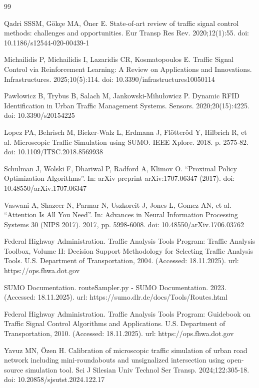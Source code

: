\documentclass[12pt,a4paper]{article}
\begin{document}
\begin{thebibliography}{99}

Qadri SSSM, Gökçe MA, Öner E. State-of-art review of traffic signal control methods: challenges and opportunities. Eur Transp Res Rev. 2020;12(1):55. doi: 10.1186/s12544-020-00439-1

Michailidis P, Michailidis I, Lazaridis CR, Kosmatopoulos E. Traffic Signal Control via Reinforcement Learning: A Review on Applications and Innovations. Infrastructures. 2025;10(5):114. doi: 10.3390/infrastructures10050114

Pawłowicz B, Trybus B, Salach M, Jankowski-Mihułowicz P. Dynamic RFID Identification in Urban Traffic Management Systems. Sensors. 2020;20(15):4225. doi: 10.3390/s20154225

Lopez PA, Behrisch M, Bieker-Walz L, Erdmann J, Flötteröd Y, Hilbrich R, et al. Microscopic Traffic Simulation using SUMO. IEEE Xplore. 2018. p. 2575-82. doi: 10.1109/ITSC.2018.8569938

Schulman J, Wolski F, Dhariwal P, Radford A, Klimov O. ``Proximal Policy Optimization Algorithms''. In: arXiv preprint arXiv:1707.06347 (2017). doi: 10.48550/arXiv.1707.06347

Vaswani A, Shazeer N, Parmar N, Uszkoreit J, Jones L, Gomez AN, et al. ``Attention Is All You Need''. In: Advances in Neural Information Processing Systems 30 (NIPS 2017). 2017, pp. 5998-6008. doi: 10.48550/arXiv.1706.03762

Federal Highway Administration. Traffic Analysis Tools Program: Traffic Analysis Toolbox, Volume II: Decision Support Methodology for Selecting Traffic Analysis Tools. U.S. Department of Transportation, 2004. (Accessed: 18.11.2025). url: https://ops.fhwa.dot.gov

SUMO Documentation. routeSampler.py - SUMO Documentation. 2023. (Accessed: 18.11.2025). url: https://sumo.dlr.de/docs/Tools/Routes.html

Federal Highway Administration. Traffic Analysis Tools Program: Guidebook on Traffic Signal Control Algorithms and Applications. U.S. Department of Transportation, 2010. (Accessed: 18.11.2025). url: https://ops.fhwa.dot.gov

Yavuz MN, Özen H. Calibration of microscopic traffic simulation of urban road network including mini-roundabouts and unsignalized intersection using open-source simulation tool. Sci J Silesian Univ Technol Ser Transp. 2024;122:305-18. doi: 10.20858/sjsutst.2024.122.17


\end{thebibliography}
\end{document}
